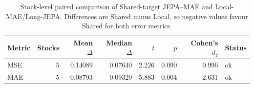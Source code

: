 \begin{table}[t]
\centering
\small
\caption{Stock-level paired comparison of Shared-target JEPA--MAE and Local-MAE/Long-JEPA. Differences are Shared minus Local, so negative values favour Shared for both error metrics.}
\label{tab:shared_vs_local}
\begin{tabular}{lrrrrrrl}
\toprule
Metric & Stocks & Mean $\Delta$ & Median $\Delta$ & $t$ & $p$ & Cohen's $d_z$ & Status \\
\midrule
MSE & 5 & 0.14089 & 0.07640 & 2.226 & 0.090 & 0.996 & ok \\
MAE & 5 & 0.08793 & 0.09329 & 5.883 & 0.004 & 2.631 & ok \\
\bottomrule
\end{tabular}
\end{table}
